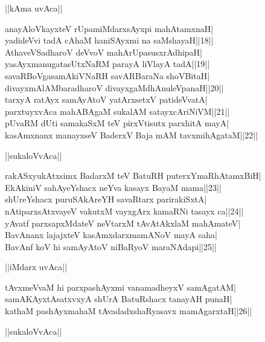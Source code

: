 \documentclass{article}
\begin{document}
\begin{center}
||kAma uvAca||
\end{center}

anayAloVkayxteV rUpamiMdarxsAyxpi mahAtamxnaH|\\
yadideVvi tadA cAhaM haniSAyxmi na saMshayaH||18||\\
AthaveVSadharoV deVvoV mahArUpasusxrAdhipaH|\\
yasAyxmanugatasUtxNaRM parayA liVlayA tadA||19||\\
savaRBoVgasamAkiVNaRH savARBaraNa shoVBitaH|\\
divayxmAlAMbaradharoV divayxgaMdhAnuleVpanaH||20||\\
tarxyA ratAyx samAyAtoV yatArxsetxV patideVvatA|\\
parxtuyxvAca mahABAgaM sukalAM satayxcAriNiVM||21||\\
pUvaRM dUti samakaSxM teV pirxVtisutx parxhitA mayA|\\
kasAmxnanx manayxseV BaderxV Baja mAM tavxmihAgataM||22||\\

\begin{center}
||sukaloVvAca||
\end{center}

rakASxyukAtxsimx BadarxM teV BatuRH puterxYmaRhAtamxBiH|\\
EkAkiniV sahAyeYshacx neYva kasayx BayaM mama||23||\\
shUreYshacx puruSAkAreYH savaRtarx parirakiSxtA|\\
nAtiparxsAtxvayeV vakutxM vayxgArx kamaRNi tasayx ca||24||\\
yAvatf parxsapxMdateV neVtarxM tAvAtAkxlaM mahAmateV|\\
BavAnanx lajajxteV kasAmxdarxmamANoV mayA saha|\\
BavAnf koV hi samAyAtoV niBaRyoV maraNAdapi||25||\\

\begin{center}
||iMdarx uvAca||
\end{center}

tAvxmeVvaM hi parxpashAyxmi vanamadheyxV samAgatAM|\\
samAKAyxtAsatxvxyA shUrA BatuRshacx tanayAH punaH|\\
kathaM pashAyxmahaM tAvadadxshaRyasavx mamAgarxtaH||26||\\

\begin{center}
||sukaloVvAca||
\end{center}
\end{document}
